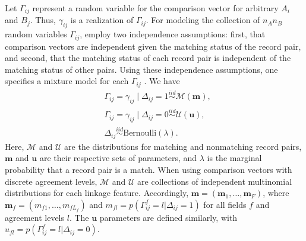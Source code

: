 \documentclass[ba]{imsart}
\begin{document}
Let $\Gamma_{ij}$ represent a random variable for the comparison vector for arbitrary $A_i$ and $B_j$.  Thus, $\gamma_{ij}$ is a realization of $\Gamma_{ij}$. For modeling the collection of $n_An_B$ random variables $\Gamma_{ij}$, \cite{fellegi_theory_1969} employ two independence assumptions: first, that comparison vectors are independent given the matching status of the record pair, and second, that the matching status of each record pair is independent of the matching status of other pairs. Using these independence assumptions, one specifies a mixture model for each $\Gamma_{ij}$ \citep[e.g., as in ][]{winkler_state_1999,jaro1989,larsen_2001,enamorado2019using}.  We have
\begin{subequations}
\begin{align}
&\Gamma_{ij} = \gamma_{ij} \mid \Delta_{ij} = 1 \stackrel{iid}{\sim} \mathcal{M}(\bm{m}), \label{eqn:fs_model} \\
&\Gamma_{ij} = \gamma_{ij} \mid \Delta_{ij} = 0  \stackrel{iid}{\sim} \mathcal{U}(\bm{u}), \label{eqn:m_dist}\\
&\Delta_{ij}   \stackrel{iid}{\sim} \text{Bernoulli}(\lambda). \label{eqn:lambda_dist}
\end{align}
\end{subequations}
Here, $\mathcal{M}$ and $\mathcal{U}$ are the distributions for matching and nonmatching record pairs, $\bm{m}$ and $\bm{u}$ are their respective sets of parameters, and $\lambda$ is the marginal probability that a record pair is a match. When using comparison vectors with discrete agreement levels, $\mathcal{M}$ and $\mathcal{U}$ are collections of independent multinomial distributions for each linkage feature. Accordingly, $\bm{m} = (\bm{m}_1, \ldots, \bm{m}_F)$, where $\bm{m}_f = (m_{f1}, \ldots, m_{fL_f})$ and $m_{fl} = p(\Gamma_{ij}^f = l|\Delta_{ij} = 1)$ for all fields $f$ and agreement levels $l$. The $\bm{u}$ parameters are defined similarly, with $u_{fl} = p(\Gamma_{ij}^f = l|\Delta_{ij} = 0)$.
\end{document}
